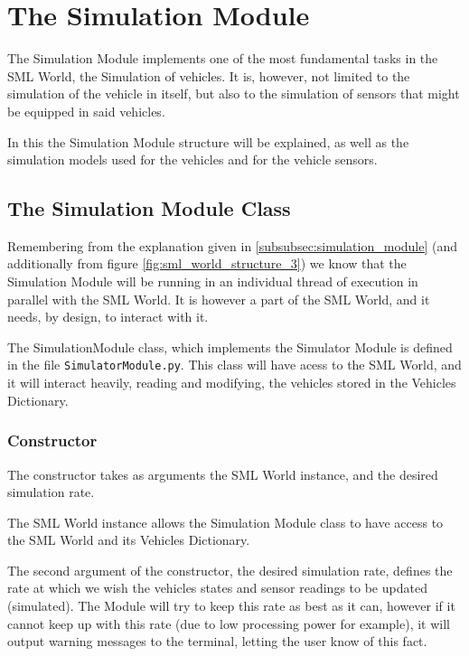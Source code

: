 
\graphicspath{ {SectionTheSimulationModule/Images/} }

\section{The Simulation Module}
\label{sec:the_simulation_module}

The Simulation Module implements one of the most fundamental tasks in the SML World, the Simulation of vehicles. It is, however, not limited to the simulation of the vehicle in itself, but also to the simulation of sensors that might be equipped in said vehicles.

In this the Simulation Module structure will be explained, as well as the simulation models used for the vehicles and for the vehicle sensors.

\subsection{The Simulation Module Class}

Remembering from the explanation given in \ref{subsubsec:simulation_module} (and additionally from figure \ref{fig:sml_world_structure_3}) we know that the Simulation Module will be running in an individual thread of execution in parallel with the SML World. It is however a part of the SML World, and it needs, by design, to interact with it.

The SimulationModule class, which implements the Simulator Module is defined in the file \texttt{SimulatorModule.py}. This class will have acess to the SML World, and it will interact heavily, reading and modifying, the vehicles stored in the Vehicles Dictionary.

\subsubsection{Constructor}

The constructor takes as arguments the SML World instance, and the desired simulation rate.

The SML World instance allows the Simulation Module class to have access to the SML World and its Vehicles Dictionary.

The second argument of the constructor, the desired simulation rate, defines the rate at which we wish the vehicles states and sensor readings to be updated (simulated). The Module will try to keep this rate as best as it can, however if it cannot keep up with this rate (due to low processing power for example), it will output warning messages to the terminal, letting the user know of this fact.

